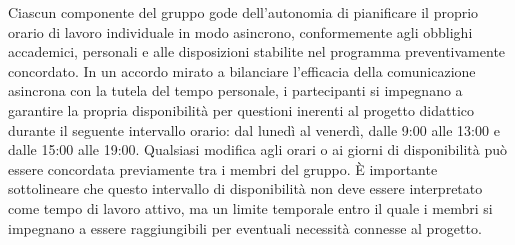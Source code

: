 \documentclass[8pt]{article}
\begin{document}
Ciascun componente del gruppo gode dell'autonomia di pianificare il proprio orario di lavoro individuale in modo asincrono, conformemente agli obblighi accademici, personali e alle disposizioni stabilite nel programma preventivamente concordato.
In un accordo mirato a bilanciare l'efficacia della comunicazione asincrona con la tutela del tempo personale, i partecipanti si impegnano a garantire la propria disponibilità per questioni inerenti al progetto didattico durante il seguente intervallo orario: dal lunedì al venerdì, dalle 9:00 alle 13:00 e dalle 15:00 alle 19:00. Qualsiasi modifica agli orari o ai giorni di disponibilità può essere concordata previamente tra i membri del gruppo. È importante sottolineare che questo intervallo di disponibilità non deve essere interpretato come tempo di lavoro attivo, ma un limite temporale entro il quale i membri si impegnano a essere raggiungibili per eventuali necessità connesse al progetto.
\end{document}
